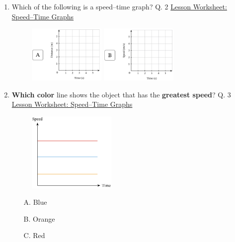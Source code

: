 \documentclass[A4,12pt]{article}
\begin{document}
\begin{enumerate}[label=\bfseries (\arabic*)]
\item Which of the following is a speed–time graph? \cite{Nagwa} Q. 2 \href{https://www.nagwa.com/en/worksheets/257191315239/}{Lesson Worksheet: Speed–Time Graphs}\\
%
\begin{figure}[H]
    \centering
    \includegraphics[width=0.35\textwidth]{Nagwa_Q1_Speedt-1.png}
    \includegraphics[width=0.35\textwidth]{Nagwa_Q1_Speedt-2.png}
\end{figure}












\item \textbf{Which color} line shows the object that has the \textbf{greatest speed}? \cite{Nagwa} Q. 3 \href{https://www.nagwa.com/en/worksheets/257191315239/}{Lesson Worksheet: Speed–Time Graphs}
%
\begin{figure}[H]
    \centering
    \includegraphics[width=0.4\textwidth]{Nagwa_Q3_Speedt.png}
\end{figure}
%
\begin{itemize}
    \item[A.] Blue
    \item[B.] Orange
    \item[C.] Red
\end{itemize}
%











\end{enumerate}
\end{document}
